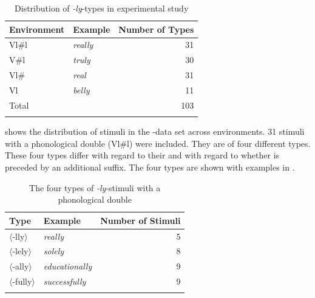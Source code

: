 \begin{table}[b]
	\caption{Distribution of \textit{-ly}-types in experimental study}
	\label{tbl:distribution of ly types in experiment}
	
	
		\begin{tabular} {llr}
\lsptoprule			
			Environment & Example & Number of  Types\\
			\midrule
			Vl\#l &\textit{really} & 31 \\ 
			V\#l &\textit{truly} & 30 \\ 
			Vl\# &\textit{real} & 31\\ 
			Vl &\textit{belly} & 11\\ 
			\midrule   	
			Total&  & 103 \\ 
			\lspbottomrule                                                                                
		\end{tabular}
	
\end{table}




 shows the distribution of  stimuli in the -data set across environments. 
31 stimuli with a phonological double (Vl\#l) were included. 
They are of four different types. These four types differ with regard to their  and with regard to whether  is preceded by an additional suffix. The four types are shown with examples in .\pagebreak

\begin{table}
	\caption{The four types of \textit{-ly}-stimuli with a phonological double\label{tbl:The four types of ly-stimuli with a phonological double}}
		\begin{tabular} {llr}
\lsptoprule
			Type & Example & Number of  Stimuli\\
			\midrule
			$\langle$-lly$\rangle$&\textit{really} & 5 \\ 
			$\langle$-lely$\rangle$  \phantom{hggzujg}&\textit{solely} & 8\\ 
			$\langle$-ally$\rangle$&\textit{educationally} &9\\ 
			$\langle$-fully$\rangle$&\textit{successfully} & 9 \\ 
			\lspbottomrule                                                                                
		\end{tabular}
\end{table}


